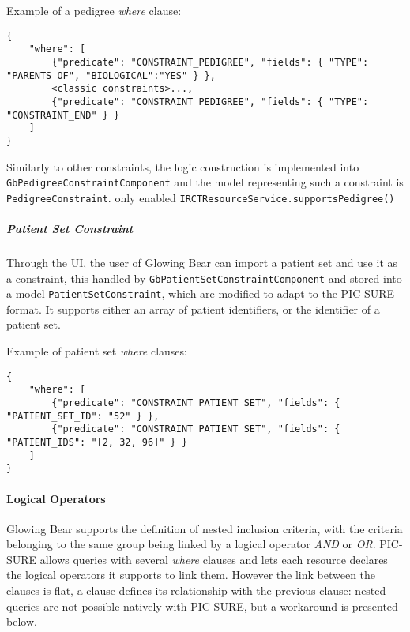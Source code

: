 Example of a pedigree \emph{where} clause:
\begin{verbatim}
{
    "where": [
        {"predicate": "CONSTRAINT_PEDIGREE", "fields": { "TYPE": "PARENTS_OF", "BIOLOGICAL":"YES" } },
        <classic constraints>..., 
        {"predicate": "CONSTRAINT_PEDIGREE", "fields": { "TYPE": "CONSTRAINT_END" } }
    ]
}
\end{verbatim}

Similarly to other constraints, the logic construction is implemented into \verb|GbPedigreeConstraintComponent| and the model representing such a constraint is \verb|PedigreeConstraint|.
only enabled \verb|IRCTResourceService.supportsPedigree()|

\subparagraph{Patient Set Constraint}
Through the UI, the user of Glowing Bear can import a patient set and use it as a constraint, this handled by \verb|GbPatientSetConstraintComponent| and stored into a model \verb|PatientSetConstraint|, which are modified to adapt to the PIC-SURE format.
It supports either an array of patient identifiers, or the identifier of a patient set.

Example of patient set \emph{where} clauses:
\begin{verbatim}
{
    "where": [
        {"predicate": "CONSTRAINT_PATIENT_SET", "fields": { "PATIENT_SET_ID": "52" } },
        {"predicate": "CONSTRAINT_PATIENT_SET", "fields": { "PATIENT_IDS": "[2, 32, 96]" } }
    ]
}
\end{verbatim}


\paragraph{Logical Operators}
Glowing Bear supports the definition of nested inclusion criteria, with the criteria belonging to the same group being linked by a logical operator \emph{AND} or \emph{OR}.
PIC-SURE allows queries with several \emph{where} clauses and lets each resource declares the logical operators it supports to link them. 
However the link between the clauses is flat, a clause defines its relationship with the previous clause: nested queries are not possible natively with PIC-SURE, but a workaround is presented below.

